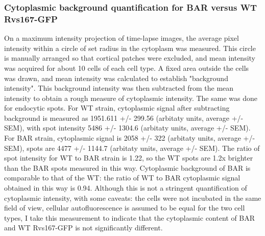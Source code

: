 \subsubsection{Cytoplasmic background quantification for BAR versus WT Rvs167-GFP}
On a maximum intensity projection of time-lapse images, the average pixel intensity within a circle of set radius in the cytoplasm was measured. This circle is manually arranged so that cortical patches were excluded, and mean intensity was acquired for about 10 cells of each cell type. A fixed area outside the cells was drawn, and mean intensity was calculated to establish "background intensity". This background intensity was then subtracted from the mean intensity to obtain a rough measure of cytoplasmic intensity. The same was done for endocytic spots.
For WT strain, cytoplasmic signal after subtracting background is measured as 1951.611 +/- 299.56 (arbitaty units, average +/- SEM), with spot intensity 5486 +/- 1304.6 (arbitaty units, average +/- SEM).
For BAR strain, cytoplasmic signal is 2058 +/- 322 (arbitaty units, average +/- SEM), spots are 4477 +/- 1144.7 (arbitaty units, average +/- SEM). 
The ratio of spot intensity for WT to BAR strain is 1.22, so the WT spots are 1.2x brighter than the BAR spots measured in this way. Cytoplasmic background of BAR is comparable to that of the WT: the ratio of WT to BAR cytoplasmic signal obtained in this way is 0.94. Although this is not a stringent quantification of cytoplasmic intensity, with some caveats: the cells were not incubated in the same field of view, cellular autofluorescence is assumed to be equal for the two cell types, I take this measurement to indicate that the cytoplasmic content of BAR and WT Rvs167-GFP is not significantly different.


